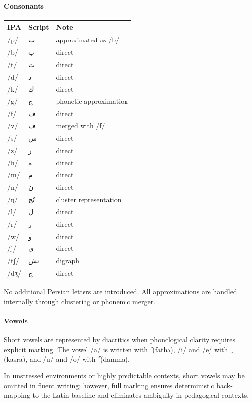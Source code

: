 \documentclass[12pt]{article}
\newcommand{\AR}[1]{\foreignlanguage{arabic}{#1}}
\begin{document}
\paragraph{Consonants}

\begin{center}
\begin{tabular}{lll}
IPA & Script & Note \\
\hline
/p/ & \AR{ب} & approximated as /b/ \\
/b/ & \AR{ب} & direct \\
/t/ & \AR{ت} & direct \\
/d/ & \AR{د} & direct \\
/k/ & \AR{ك} & direct \\
/g/ & \AR{ج} & phonetic approximation \\
/f/ & \AR{ف} & direct \\
/v/ & \AR{ف} & merged with /f/ \\
/s/ & \AR{س} & direct \\
/z/ & \AR{ز} & direct \\
/h/ & \AR{ه} & direct \\
/m/ & \AR{م} & direct \\
/n/ & \AR{ن} & direct \\
/ŋ/ & \AR{نْج} & cluster representation \\
/l/ & \AR{ل} & direct \\
/r/ & \AR{ر} & direct \\
/w/ & \AR{و} & direct \\
/j/ & \AR{ي} & direct \\
/tʃ/ & \AR{تش} & digraph \\
/dʒ/ & \AR{ج} & direct \\
\end{tabular}
\end{center}

No additional Persian letters are introduced. All approximations are handled internally through clustering or phonemic merger.

\paragraph{Vowels}

Short vowels are represented by diacritics when phonological clarity requires explicit marking. The vowel /a/ is written with \AR{َ} (fatha), /i/ and /e/ with \AR{ِ} (kasra), and /u/ and /o/ with \AR{ُ} (damma).

In unstressed environments or highly predictable contexts, short vowels may be omitted in fluent writing; however, full marking ensures deterministic back-mapping to the Latin baseline and eliminates ambiguity in pedagogical contexts.
\end{document}

